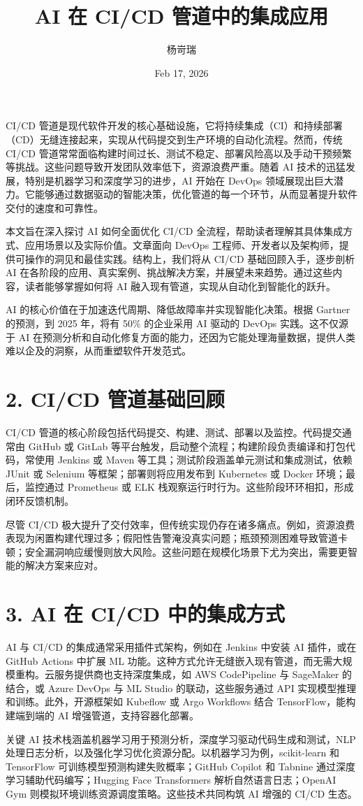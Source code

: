 \title{AI 在 CI/CD 管道中的集成应用}
\author{杨岢瑞}
\date{Feb 17, 2026}
\maketitle
CI/CD 管道是现代软件开发的核心基础设施，它将持续集成（CI）和持续部署（CD）无缝连接起来，实现从代码提交到生产环境的自动化流程。然而，传统 CI/CD 管道常常面临构建时间过长、测试不稳定、部署风险高以及手动干预频繁等挑战。这些问题导致开发团队效率低下，资源浪费严重。随着 AI 技术的迅猛发展，特别是机器学习和深度学习的进步，AI 开始在 DevOps 领域展现出巨大潜力。它能够通过数据驱动的智能决策，优化管道的每一个环节，从而显著提升软件交付的速度和可靠性。\par
本文旨在深入探讨 AI 如何全面优化 CI/CD 全流程，帮助读者理解其具体集成方式、应用场景以及实际价值。文章面向 DevOps 工程师、开发者以及架构师，提供可操作的洞见和最佳实践。结构上，我们将从 CI/CD 基础回顾入手，逐步剖析 AI 在各阶段的应用、真实案例、挑战解决方案，并展望未来趋势。通过这些内容，读者能够掌握如何将 AI 融入现有管道，实现从自动化到智能化的跃升。\par
AI 的核心价值在于加速迭代周期、降低故障率并实现智能化决策。根据 Gartner 的预测，到 2025 年，将有 50\%{} 的企业采用 AI 驱动的 DevOps 实践。这不仅源于 AI 在预测分析和自动化修复方面的能力，还因为它能处理海量数据，提供人类难以企及的洞察，从而重塑软件开发范式。\par
\chapter{2. CI/CD 管道基础回顾}
CI/CD 管道的核心阶段包括代码提交、构建、测试、部署以及监控。代码提交通常由 GitHub 或 GitLab 等平台触发，启动整个流程；构建阶段负责编译和打包代码，常使用 Jenkins 或 Maven 等工具；测试阶段涵盖单元测试和集成测试，依赖 JUnit 或 Selenium 等框架；部署则将应用发布到 Kubernetes 或 Docker 环境；最后，监控通过 Prometheus 或 ELK 栈观察运行时行为。这些阶段环环相扣，形成闭环反馈机制。\par
尽管 CI/CD 极大提升了交付效率，但传统实现仍存在诸多痛点。例如，资源浪费表现为闲置构建代理过多；假阳性告警淹没真实问题；瓶颈预测困难导致管道卡顿；安全漏洞响应缓慢则放大风险。这些问题在规模化场景下尤为突出，需要更智能的解决方案来应对。\par
\chapter{3. AI 在 CI/CD 中的集成方式}
AI 与 CI/CD 的集成通常采用插件式架构，例如在 Jenkins 中安装 AI 插件，或在 GitHub Actions 中扩展 ML 功能。这种方式允许无缝嵌入现有管道，而无需大规模重构。云服务提供商也支持深度集成，如 AWS CodePipeline 与 SageMaker 的结合，或 Azure DevOps 与 ML Studio 的联动，这些服务通过 API 实现模型推理和训练。此外，开源框架如 Kubeflow 或 Argo Workflows 结合 TensorFlow，能构建端到端的 AI 增强管道，支持容器化部署。\par
关键 AI 技术栈涵盖机器学习用于预测分析，深度学习驱动代码生成和测试，NLP 处理日志分析，以及强化学习优化资源分配。以机器学习为例，scikit-learn 和 TensorFlow 可训练模型预测构建失败概率；GitHub Copilot 和 Tabnine 通过深度学习辅助代码编写；Hugging Face Transformers 解析自然语言日志；OpenAI Gym 则模拟环境训练资源调度策略。这些技术共同构筑 AI 增强的 CI/CD 生态。\par

